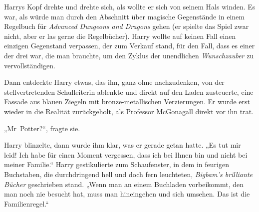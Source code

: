 Harrys Kopf drehte und drehte sich, als wollte er sich von seinem Hals winden. Es war, als würde man durch den Abschnitt über magische Gegenstände in einem Regelbuch für \emph{Advanced Dungeons and Dragons} gehen (er spielte das Spiel zwar nicht, aber er las gerne die Regelbücher). Harry wollte auf keinen Fall einen einzigen Gegenstand verpassen, der zum Verkauf stand, für den Fall, dass es einer der drei war, die man brauchte, um den Zyklus der unendlichen \emph{Wunschzauber} zu vervollständigen.

Dann entdeckte Harry etwas, das ihn, ganz ohne nachzudenken, von der stellvertretenden Schulleiterin ablenkte und direkt auf den Laden zusteuerte, eine Fassade aus blauen Ziegeln mit bronze-metallischen Verzierungen. Er wurde erst wieder in die Realität zurückgeholt, als Professor McGonagall direkt vor ihn trat.

„Mr~Potter?“, fragte sie.

Harry blinzelte, dann wurde ihm klar, was er gerade getan hatte. „Es tut mir leid! Ich habe für einen Moment vergessen, dass ich bei Ihnen bin und nicht bei meiner Familie.“ Harry gestikulierte zum Schaufenster, in dem in feurigen Buchstaben, die durchdringend hell und doch fern leuchteten, \emph{Bigbam's brilliante Bücher} geschrieben stand. „Wenn man an einem Buchladen vorbeikommt, den man noch nie besucht hat, muss man hineingehen und sich umsehen. Das ist die Familienregel.“

